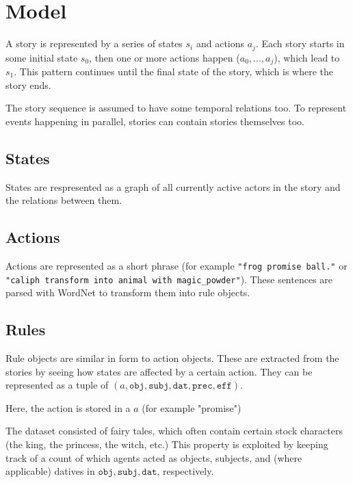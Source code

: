 \section{Model}

A story is represented by a series of states $s_i$ and actions $a_j$.
Each story starts in some initial state $s_0$, then one or more actions happen
($a_0, ..., a_j$), which lead to $s_1$. This pattern continues until the final 
state of the story, which is where the story ends.

The story sequence is assumed to have some temporal relations too. To represent
events happening in parallel, stories can contain stories themselves too.

\subsection{States}

States are respresented as a graph of all currently active actors in the story
and the relations between them.

\subsection{Actions}

Actions are represented as a short phrase (for example 
\texttt{"frog promise ball."}
or \texttt{"caliph transform into animal with magic\_powder"}).
These sentences are parsed with WordNet %
to transform them into rule objects.

\subsection{Rules}

Rule objects are similar in form to action objects. These are extracted from 
the stories by seeing how states are affected by a certain action.
They can be represented as a tuple of $(a, \texttt{obj}, \texttt{subj}, \texttt{dat},
\texttt{prec}, \texttt{eff})$.

Here, the action is stored in a $a$ (for example "promise")

The dataset consisted of fairy tales, which often contain certain stock 
characters (the king, the princess, the witch, etc.)
This property is exploited by keeping track of a count of which agents
acted as objects, subjects, and (where applicable) datives in 
$\texttt{obj}, \texttt{subj}, \texttt{dat}$, respectively.

